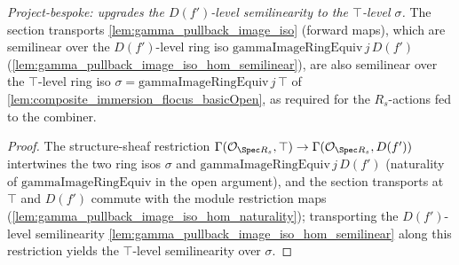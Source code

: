 \begin{lemma}
  \label{lem:gamma_image_iso_semilinear_top}
  \textit{Project-bespoke: upgrades the $D(f')$-level semilinearity to the $\top$-level $\sigma$.}
  The section transports \cref{lem:gamma_pullback_image_iso} (forward maps), which are semilinear over
  the \(D(f')\)-level ring iso \(\mathrm{gammaImageRingEquiv}\,j\,D(f')\)
  (\cref{lem:gamma_pullback_image_iso_hom_semilinear}), are also semilinear over the \(\top\)-level ring
  iso \(\sigma = \mathrm{gammaImageRingEquiv}\,j\,\top\) of
  \cref{lem:composite_immersion_flocus_basicOpen}, as required for the \(R_s\)-actions fed to the
  combiner.
\end{lemma}
\begin{proof}
  The structure-sheaf restriction \(\Gamma(\mathcal{O}_{\Spec R_s}, \top) \to \Gamma(\mathcal{O}_{\Spec
  R_s}, D(f'))\) intertwines the two ring isos \(\sigma\) and \(\mathrm{gammaImageRingEquiv}\,j\,D(f')\)
  (naturality of \(\mathrm{gammaImageRingEquiv}\) in the open argument), and the section transports at
  \(\top\) and \(D(f')\) commute with the module restriction maps
  (\cref{lem:gamma_pullback_image_iso_hom_naturality}); transporting the \(D(f')\)-level semilinearity
  \cref{lem:gamma_pullback_image_iso_hom_semilinear} along this restriction yields the \(\top\)-level
  semilinearity over \(\sigma\).
\end{proof}

